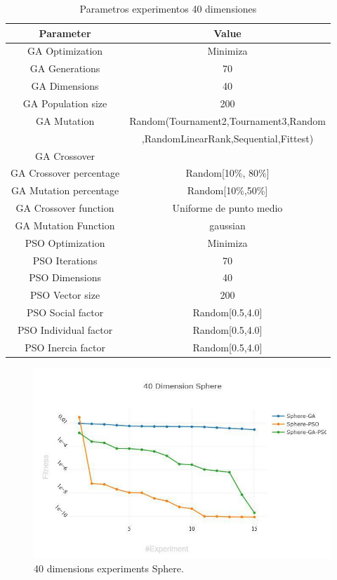 \documentclass[runningheads]{llncs}
\begin{document}
    \begin{table}[htp]
      \caption{Parametros experimentos 40 dimensiones}
      \label{table:ga-pso-parameters-20}
      \centering
      \begin{tabular}{|c|c|}
      \hline
      Parameter & Value \\
      \hline
      \hline
      GA Optimization& Minimiza \\
      \hline
      GA Generations & 70 \\
      \hline
      GA Dimensions & 40 \\
      \hline
      GA Population size & 200 \\
      \hline
      GA Mutation & Random(Tournament2,Tournament3,Random \\
      &  ,RandomLinearRank,Sequential,Fittest)\\
      \hline
      GA Crossover \\
      \hline
      GA Crossover percentage & Random[10\%, 80\%] \\
      \hline
      GA Mutation percentage & Random[10\%,50\%] \\
      \hline
      GA Crossover function & Uniforme de punto medio \\
      \hline
      GA Mutation Function & gaussian \\
      \hline
      PSO Optimization & Minimiza \\
      \hline
      PSO Iterations & 70 \\
      \hline
      PSO Dimensions & 40 \\
      \hline
      PSO Vector size& 200 \\
      \hline
      PSO Social factor & Random[0.5,4.0] \\
      \hline
      PSO Individual factor & Random[0.5,4.0] \\
      \hline
      PSO Inercia factor & Random[0.5,4.0] \\
      \hline
      \end{tabular}
      \end{table}
    
      \begin{figure}[htp]
        \includegraphics[width=\textwidth]{img/40-sphere.jpg}
        \caption{40 dimensions experiments Sphere.} \label{fig1}
        \end{figure}
\end{document}

